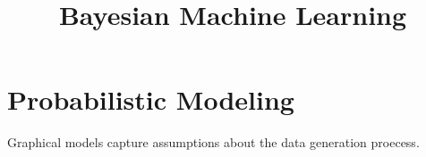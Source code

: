 \documentclass[11pt]{article}
\title{Bayesian Machine Learning}
\author{}
\date{}
\begin{document}
\maketitle

\section{Probabilistic Modeling}
Graphical models capture assumptions about the data generation proecess.
\end{document}
